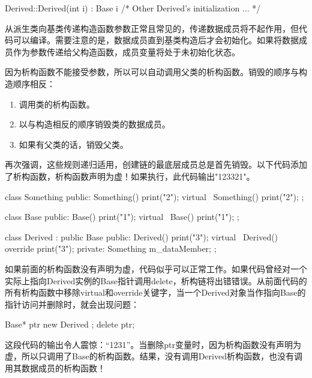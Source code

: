 \begin{cpp}
Derived::Derived(int i) : Base { i } { /* Other Derived's initialization ... */ }
\end{cpp}

从派生类向基类传递构造函数参数正常且常见的，传递数据成员将不起作用，但代码可以编译。需要注意的是，数据成员直到基类构造后才会初始化。如果将数据成员作为参数传递给父构造函数，成员变量将处于未初始化状态。


因为析构函数不能接受参数，所以可以自动调用父类的析构函数。销毁的顺序与构造顺序相反：

\begin{enumerate}
\item
调用类的析构函数。

\item
以与构造相反的顺序销毁类的数据成员。

\item
如果有父类的话，销毁父类。
\end{enumerate}

再次强调，这些规则递归适用，创建链的最底层成员总是首先销毁。以下代码添加了析构函数，析构函数声明为虚！如果执行，此代码输出"123321"。

\begin{cpp}
class Something
{
    public:
        Something() { print("2"); }
        virtual ~Something() { print("2"); }
};

class Base
{
    public:
        Base() { print("1"); }
        virtual ~Base() { print("1"); }
};

class Derived : public Base
{
    public:
        Derived() { print("3"); }
        virtual ~Derived() override { print("3"); }
    private:
        Something m_dataMember;
};
\end{cpp}

如果前面的析构函数没有声明为虚，代码似乎可以正常工作。如果代码曾经对一个实际上指向Derived实例的Base指针调用delete，析构链将出错错误。从前面代码的所有析构函数中移除virtual和override关键字，当一个Derived对象当作指向Base的指针访问并删除时，就会出现问题：

\begin{cpp}
Base* ptr { new Derived{} };
delete ptr;
\end{cpp}

这段代码的输出令人震惊：“1231”。当删除ptr变量时，因为析构函数没有声明为虚，所以只调用了Base的析构函数。结果，没有调用Derived析构函数，也没有调用其数据成员的析构函数！


